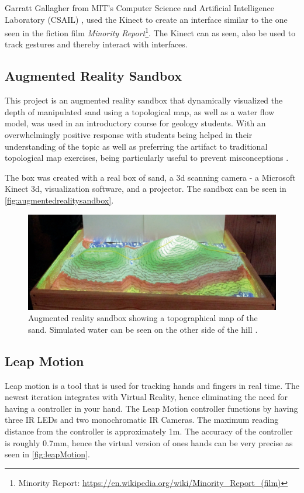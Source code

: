         Garratt Gallagher from MIT’s Computer Science and Artificial Intelligence Laboratory (CSAIL) \cite{MR_MIT}, used the Kinect to create an interface similar to the one seen in the fiction film \textit{Minority Report}\footnote{Minority Report: \url{https://en.wikipedia.org/wiki/Minority_Report_(film)}}. The Kinect can as seen, also be used to track gestures and thereby interact with interfaces. 

	\subsection{Augmented Reality Sandbox} %
	    This project is an augmented reality sandbox that dynamically visualized the depth of manipulated sand using a topological map, as well as a water flow model, was used in an introductory course for geology students. With an overwhelmingly positive response with students being helped in their understanding of the topic as well as preferring the artifact to traditional topological map exercises, being particularly useful to prevent misconceptions \cite{woods2016pilot}.

	    The box was created with a real box of sand, a 3d scanning camera - a Microsoft Kinect 3d,  visualization software, and a projector.  The sandbox can be seen in \autoref{fig:augmentedrealitysandbox}.
	
	\begin{figure}[H]
		\centering
		\includegraphics[width=0.9\linewidth]{figure/Analysis/augmentedrealitysandbox.png}
		\caption{Augmented reality sandbox showing a topographical map of the sand. Simulated water can be seen on the other side of the hill \cite{woods2016pilot}.}
		\label{fig:augmentedrealitysandbox}
	\end{figure}



\subsection{Leap Motion} %
    Leap motion is a tool that is used for tracking hands and fingers in real time\cite{leapMotion}. The newest iteration integrates with Virtual Reality, hence eliminating the need for having a controller in your hand. The Leap Motion controller functions by having three IR LEDs and two monochromatic IR Cameras. The maximum reading distance from the controller is approximately 1m\cite{leapMotion}. The accuracy of the controller is roughly 0.7mm, hence the virtual version of ones hands can be very precise as seen in \autoref{fig:leapMotion}.
    
